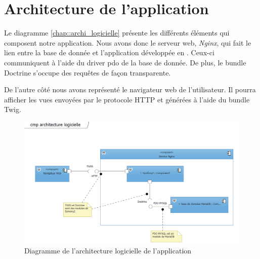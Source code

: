 \section{Architecture de l'application}

Le diagramme \ref{chap::archi_logicielle} présente les différents éléments qui composent notre application. Nous avons donc le serveur web, \textit{Nginx}, qui fait le lien entre la base de donnée \mdb et l'application développée en \symfony. Ceux-ci communiquent à l'aide du driver pdo de la base de donnée. De plus, le bundle Doctrine s'occupe des requêtes \sql de façon transparente.

De l'autre côté nous avons représenté le navigateur web de l'utilisateur. Il pourra afficher les vues envoyées par le protocole HTTP et générées à l'aide du bundle Twig.

\begin{figure}[h!]
	\centering
	\includegraphics[scale=0.5]{ArchitectureLogicielle/archi_logicielle.png}
	\caption{Diagramme de l'architecture logicielle de l'application}
	\label{fig::archi_logicielle}
\end{figure}